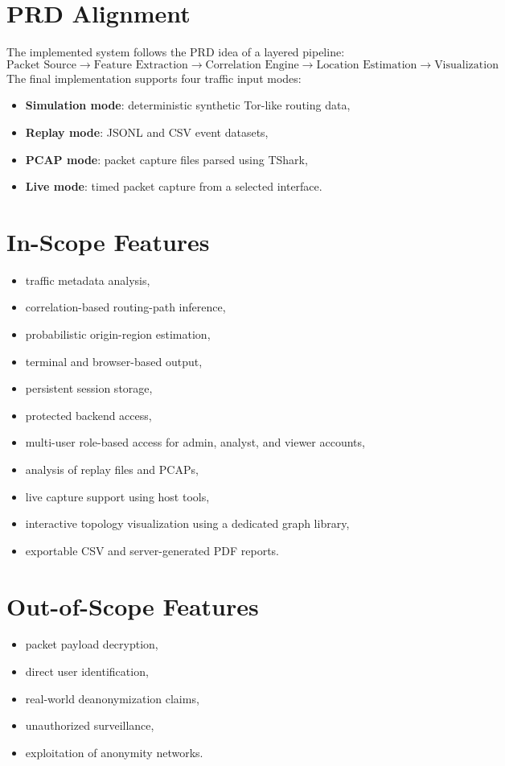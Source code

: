 \documentclass[12pt,a4paper]{report}
\begin{document}
\section{PRD Alignment}
The implemented system follows the PRD idea of a layered pipeline:
\[
\text{Packet Source} \rightarrow \text{Feature Extraction} \rightarrow \text{Correlation Engine} \rightarrow \text{Location Estimation} \rightarrow \text{Visualization}
\]
The final implementation supports four traffic input modes:
\begin{itemize}[leftmargin=1.5em]
    \item \textbf{Simulation mode}: deterministic synthetic Tor-like routing data,
    \item \textbf{Replay mode}: JSONL and CSV event datasets,
    \item \textbf{PCAP mode}: packet capture files parsed using TShark,
    \item \textbf{Live mode}: timed packet capture from a selected interface.
\end{itemize}

\section{In-Scope Features}
\begin{itemize}[leftmargin=1.5em]
    \item traffic metadata analysis,
    \item correlation-based routing-path inference,
    \item probabilistic origin-region estimation,
    \item terminal and browser-based output,
    \item persistent session storage,
    \item protected backend access,
    \item multi-user role-based access for admin, analyst, and viewer accounts,
    \item analysis of replay files and PCAPs,
    \item live capture support using host tools,
    \item interactive topology visualization using a dedicated graph library,
    \item exportable CSV and server-generated PDF reports.
\end{itemize}

\section{Out-of-Scope Features}
\begin{itemize}[leftmargin=1.5em]
    \item packet payload decryption,
    \item direct user identification,
    \item real-world deanonymization claims,
    \item unauthorized surveillance,
    \item exploitation of anonymity networks.
\end{itemize}
\end{document}
